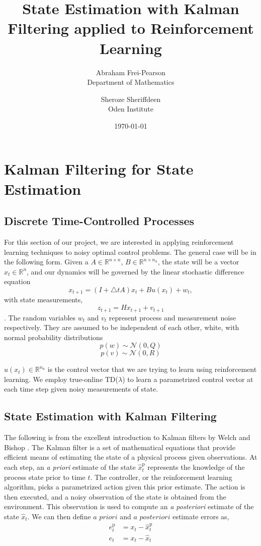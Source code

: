 \documentclass{article}
\title{State Estimation with Kalman Filtering applied to Reinforcement Learning}
\author{Abraham Frei-Pearson \\
	Department of Mathematics  \\
	\and 
	Sheroze Sheriffdeen \\
	Oden Institute \\
	}
\date{\today}
\begin{document}
\maketitle

\section{Kalman Filtering for State Estimation}
\subsection{Discrete Time-Controlled Processes}

For this section of our project, we are interested in applying reinforcement learning techniques to noisy optimal control problems. The general case will be in the following form. Given a $A \in \mathbb{R}^{n \times n}$, $B \in \mathbb{R}^{n \times n_u}$, the state will be a vector $x_t \in \mathbb R^n$, and our dynamics will be governed by the linear stochastic difference equation
\begin{equation}
    x_{t+1} = (I + \triangle t A) x_t + Bu(x_t) + w_t,
    \label{eq:dynamical}
\end{equation}
with state measurements,
\[
	z_{t+1} = H x_{t+1} + v_{t+1}
\].
The random variables $w_t$ and $v_t$ represent process and measurement noise respectively. They are assumed to be independent of each other, white, with normal probability distributions
\[ 
p(w) \sim \mathcal{N}(0, Q)
\]
\[
p(v) \sim \mathcal{N}(0, R)
\]

$u(x_t) \in \mathbb{R}^{n_u}$ is the control vector that we are trying to learn using reinforcement learning. We employ true-online TD($\lambda$) to learn a parametrized control vector at each time step given noisy measurements of state.

\subsection{State Estimation with Kalman Filtering}

The following is from the excellent introduction to Kalman filters by Welch and Bishop \cite{welch1995introduction}. The Kalman filter is a set of mathematical equations that provide efficient means of estimating the state of a physical process given observations. At each step, an \textit{a priori} estimate of the state $\hat{x}_{t}^{\text{p}}$ represents the knowledge of the process state prior to time $t$. The controller, or the reinforcement learning algorithm, picks a parametrized action given this prior estimate. The action is then executed, and a noisy observation of the state is obtained from the environment. This observation is used to compute an \textit{a posteriori} estimate of the state $\hat{x}_{t}$. We can then define $\textit{a priori}$ and $\textit{a posteriori}$ estimate errors as,
\begin{align*}
	e^{\text{p}}_t &= x_t - \hat{x}_{t}^{\text{p}} \\
	e_t &= x_t - \hat{x}_{t} 
\end{align*}
\end{document}
